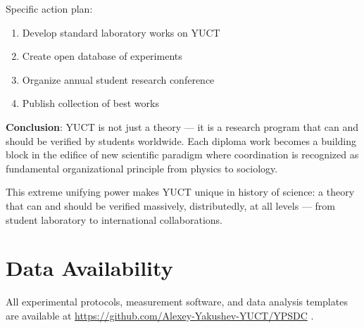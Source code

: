 \documentclass[12pt,a4paper]{article}
\begin{document}
	Specific action plan:
	\begin{enumerate}
		\item Develop standard laboratory works on YUCT
		\item Create open database of experiments
		\item Organize annual student research conference
		\item Publish collection of best works
	\end{enumerate}
	
	\textbf{Conclusion}: YUCT is not just a theory — it is a research program that can and should be verified by students worldwide. Each diploma work becomes a building block in the edifice of new scientific paradigm where coordination is recognized as fundamental organizational principle from physics to sociology.
	
	This extreme unifying power makes YUCT unique in history of science: a theory that can and should be verified massively, distributedly, at all levels — from student laboratory to international collaborations.
	
	\section*{Data Availability}
	All experimental protocols, measurement software, and data analysis templates are available at \url{https://github.com/Alexey-Yakushev-YUCT/YPSDC} .
	
\end{document}
